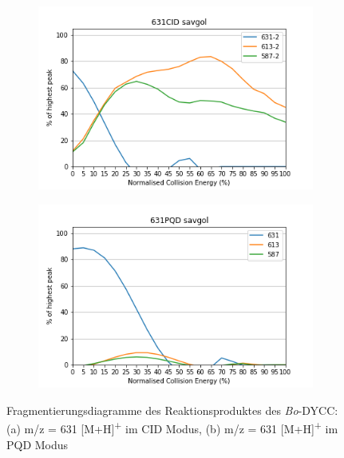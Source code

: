 \begin{figure}[!htbp]
  \begin{subfigure}[b]{0.5\textwidth}
    \includegraphics[width=\textwidth]{content/Anhang/ESIMS/RP_Bo-DYCC/631CID-631-2savgol.png}
    \caption{}
  \end{subfigure}
  \hfill
  \begin{subfigure}[b]{0.5\textwidth}
    \includegraphics[width=\textwidth]{content/Anhang/ESIMS/RP_Bo-DYCC/631PQD-631savgol.png}
    \caption{}
  \end{subfigure}
  
  \caption[Fragmentierungsdiagramme des Reaktionsproduktes des \textit{Bo}-DYCC, Quelle: Autor]{Fragmentierungsdiagramme des Reaktionsproduktes des \textit{Bo}-DYCC: (a) m/z = 631 [M+H]\textsuperscript{+} im CID Modus, (b) m/z = 631 [M+H]\textsuperscript{+} im PQD Modus}
\end{figure}


